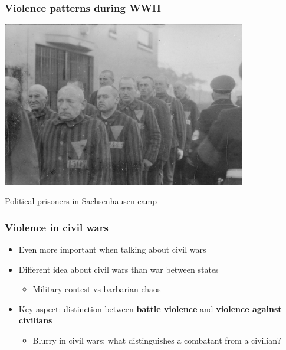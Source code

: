 \documentclass[utf8, xcolor=dvipsnames, handout]{beamer}
\begin{document}
\begin{frame}
\frametitle{Violence patterns during WWII}
\centering

\includegraphics[width = 0.8\textwidth]{img/wwii-Sachsenhausen}

Political prisoners in Sachsenhausen camp

\end{frame}


\begin{frame}
\frametitle{Violence in civil wars}
\centering

\begin{itemize}
  \item<1-> Even more important when talking about civil wars
  \item<2-> Different idea about civil wars than war between states
  \begin{itemize}
    \item Military contest vs barbarian chaos
  \end{itemize}
  \item<3-> Key aspect: distinction between \textbf{battle violence} and \textbf{violence against civilians}
  \begin{itemize}
    \item Blurry in civil wars: what distinguishes a combatant from a civilian?
  \end{itemize}
\end{itemize}

\end{frame}
\end{document}
